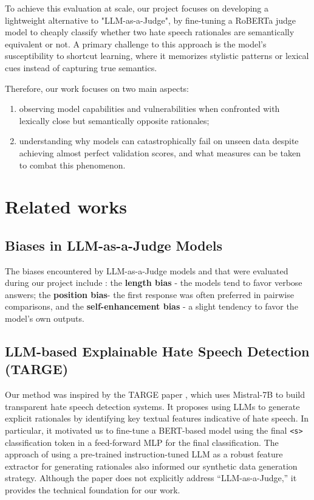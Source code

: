\documentclass[10pt,conference,compsocconf]{IEEEtran}
\begin{document}
To achieve this evaluation at scale, our project focuses on developing a lightweight alternative to "LLM-as-a-Judge", by fine-tuning a RoBERTa judge model to cheaply classify whether two hate speech rationales are semantically equivalent or not. A primary challenge to this approach is the model's susceptibility to shortcut learning, where it memorizes stylistic patterns or lexical cues instead of capturing true semantics. 

Therefore, our work focuses on two main aspects: 
\begin{enumerate}
    \item observing model capabilities and vulnerabilities when confronted with lexically close but semantically opposite rationales; 
    \item understanding why models can catastrophically fail on unseen data despite achieving almost perfect validation scores, and what measures can be taken to combat this phenomenon.
\end{enumerate} 

\section{Related works}

\subsection{Biases in LLM-as-a-Judge Models}

The biases encountered by LLM-as-a-Judge models and that were evaluated during our project include \cite{zheng2023judging}: the \textbf{length bias} - the models tend to favor verbose answers; the \textbf{position bias}- the first response was often preferred in pairwise comparisons, and the \textbf{self-enhancement bias} - a slight tendency to favor the model's own outputs. 


\subsection{LLM-based Explainable Hate Speech Detection (TARGE)}

Our method was inspired by the TARGE paper \cite{targe2025}, which uses Mistral-7B to build transparent hate speech detection systems. It proposes using LLMs to generate explicit rationales by identifying key textual features indicative of hate speech. In particular, it motivated us to fine-tune a BERT-based model using the final \texttt{<s>} classification token in a feed-forward MLP for the final classification. The approach of using a pre-trained instruction-tuned LLM as a robust feature extractor for generating rationales also informed our synthetic data generation strategy. Although the paper does not explicitly address “LLM-as-a-Judge,” it provides the technical foundation for our work.
 
\end{document}
